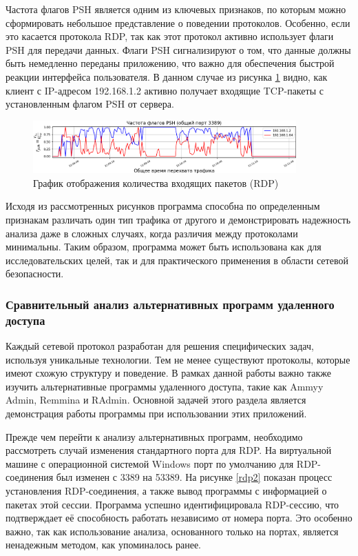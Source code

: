 \documentclass[bachelor, och, coursework]{SCWorks}
\begin{document}
Частота флагов PSH является одним из ключевых признаков, по которым можно сформировать небольшое представление о поведении протоколов. Особенно, если это касается
протокола RDP, так как этот протокол активно использует флаги PSH для передачи данных. Флаги PSH сигнализируют о том, что данные должны быть немедленно 
переданы приложению, что важно для обеспечения быстрой реакции интерфейса пользователя. В данном случае из рисунка \ref{rdpg2} видно, как клиент с IP-адресом 192.168.1.2
активно получает входящие TCP-пакеты с установленным флагом PSH от сервера.

\begin{figure}[H]
  \centering
  \includegraphics[width=0.9\textwidth]{pics/newrdp2.png}
  \caption{График отображения количества входящих пакетов (RDP)}
  \label{rdpg2}
\end{figure}



Исходя из рассмотренных рисунков программа способна по определенным признакам различать один тип трафика от другого и демонстрировать 
надежность анализа даже в сложных случаях, когда различия между протоколами минимальны. Таким образом, программа может быть использована 
как для исследовательских целей, так и для практического применения в области сетевой безопасности.

\subsubsection{Сравнительный анализ альтернативных программ удаленного доступа}

Каждый сетевой протокол разработан для решения специфических задач, используя уникальные технологии. Тем не 
менее существуют протоколы, которые имеют схожую структуру и поведение. В рамках данной работы важно также 
изучить альтернативные программы удаленного доступа, такие как Ammyy Admin, Remmina и RAdmin. Основной задачей 
этого раздела является демонстрация работы программы при использовании этих приложений.

Прежде чем перейти к анализу альтернативных программ, необходимо рассмотреть случай изменения стандартного порта для RDP. На виртуальной машине с 
операционной системой Windows порт по умолчанию для RDP-соединения был изменен с 3389 на 53389. На рисунке \ref{rdp2} показан процесс 
установления RDP-соединения, а также вывод программы с информацией о пакетах этой сессии. Программа успешно идентифицировала RDP-сессию, 
что подтверждает её способность работать независимо от номера порта. Это особенно важно, так как использование анализа, основанного только 
на портах, является ненадежным методом, как упоминалось ранее.
\end{document}
